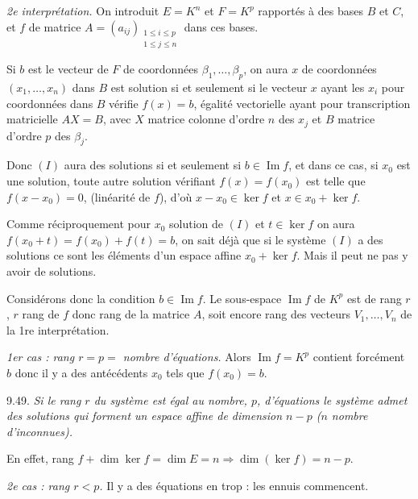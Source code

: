 \emph{2e interprétation.} On introduit $E=K^n$ et $F=K^p$ rapportés à des bases $B$ et $C$, et $f$  de matrice $A=(a_{ij})_{\substack{1\le i\le p\\1\le j\le n}}$ dans ces bases.

Si $b$ est le vecteur de $F$ de coordonnées $\beta_1,\ldots,\beta_p$, on aura $x$ de coordonnées $(x_1,\ldots,x_n)$ dans $B$ est solution si et seulement si le vecteur $x$ ayant les $x_i$ pour coordonnées dans $B$ vérifie $f(x)=b$, égalité vectorielle ayant pour transcription matricielle $AX=B$, avec $X$ matrice colonne d'ordre $n$ des $x_j$ et $B$ matrice d'ordre $p$ des $\beta_j$.

Donc $(I)$ aura des solutions si et seulement si $b\in\operatorname{Im}f$, et dans ce cas, si $x_0$ est une solution, toute autre solution vérifiant $f(x)=f(x_0)$ est telle que $f(x-x_0)=0$, (linéarité de $f$), d'où $x-x_0\in\ker f$ et $x\in x_0+\ker f$.

Comme réciproquement pour $x_0$ solution de $(I)$ et $t\in\ker f$ on aura $f(x_0+t)=f(x_0)+f(t)=b$, on sait déjà que si le système $(I)$ a des solutions ce sont les éléments d'un espace affine $x_0+\ker f$. Mais il peut ne pas y avoir de solutions.

Considérons donc la condition $b\in\operatorname{Im}f$. Le sous-espace $\operatorname{Im}f$ de $K^p$ est de rang $r$, $r$ rang de $f$ donc rang de la matrice $A$, soit encore rang des vecteurs $V_1,\ldots,V_n$ de la 1re interprétation.

\emph{1er cas : rang $r=p=$ nombre d'équations.} Alors $\operatorname{Im}f=K^p$ contient forcément $b$ donc il y a des antécédents $x_0$ tels que $f(x_0)=b$.

\medskip\noindent\textsc{9.49.} \emph{Si le rang $r$ du système est égal au nombre, $p$, d'équations le système admet des solutions qui forment un espace affine de dimension $n-p$ ($n$ nombre d'inconnues).}

En effet, rang $f+\dim\ker f=\dim E=n\Rightarrow\dim(\ker f)=n-p$. \bookend

\emph{2e cas : rang $r<p$.} Il y a des équations en trop : les ennuis commencent.

